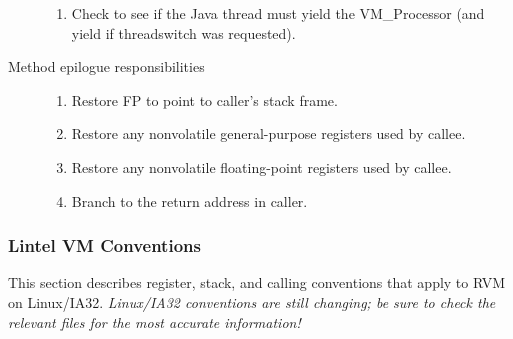 \begin{description}
\begin{enumerate}
\item Check to see if the Java thread must yield the VM\_Processor
(and yield if threadswitch was requested). 
\end{enumerate}

\item [Method epilogue responsibilities]

\begin{enumerate}
\item Restore FP to point to caller's stack frame.

\item Restore any nonvolatile general-purpose registers used by callee.

\item Restore any nonvolatile floating-point registers used by callee.

\item Branch to the return address in caller.
\end{enumerate}
\end{description}

\subsubsection{Lintel VM Conventions} \label{lintel-conventions}

This section describes register, stack, and calling conventions that
apply to RVM on Linux/IA32.  {\em Linux/IA32 conventions are still
changing; be sure to check the relevant files for the most accurate
information!}



